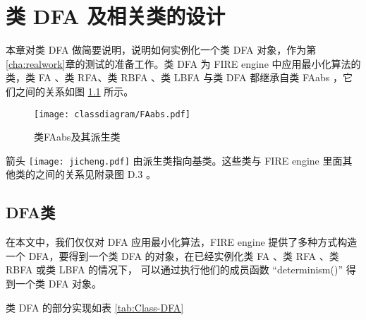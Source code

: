 \chapter{类 DFA 及相关类的设计}\label{cha:construct-dfa}

本章对类 DFA 做简要说明，说明如何实例化一个类 DFA 对象，作为第\ref{cha:realwork}章的测试的准备工作。类 DFA 为 FIRE engine 中应用最小化算法的类，类 FA 、类 RFA、类 RBFA 、类 LBFA 与类 DFA 都继承自类 FAabs ，它们之间的关系如图 \ref{fig:FAabsRel} 所示。

\begin{figure}[!htbp]
    \centering
    \texttt{[image: classdiagram/FAabs.pdf]}
    \caption{类FAabs及其派生类}
    \label{fig:FAabsRel}
\end{figure}

箭头 \texttt{[image: jicheng.pdf]} 由派生类指向基类。这些类与 FIRE engine 里面其他类的之间的关系见附录图 D.3 。

\section{DFA类}
在本文中，我们仅仅对 DFA 应用最小化算法，FIRE engine 提供了多种方式构造一个 DFA，要得到一个类 DFA 的对象，在已经实例化类 FA 、类 RFA 、类 RBFA 或类 LBFA 的情况下， 可以通过执行他们的成员函数 “determinism()” 得到一个类 DFA 对象。


类 DFA 的部分实现如表 \ref{tab:Class-DFA} 

